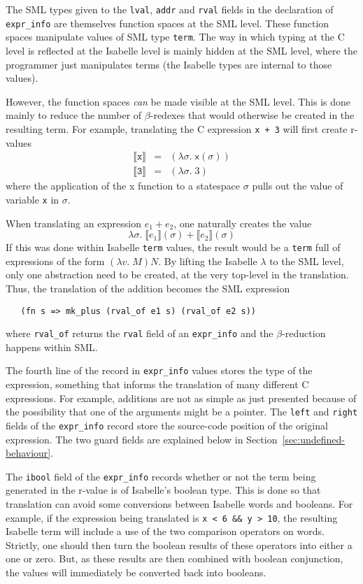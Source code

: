 \documentclass{article}
\newcommand{\Sem}[1]{\ensuremath{\llbracket#1\rrbracket}}
\begin{document}
The SML types given to the \texttt{lval}, \texttt{addr} and
\texttt{rval} fields in the declaration of \texttt{expr_info} are
themselves function spaces at the SML level.  These function spaces
manipulate values of SML type \texttt{term}.  The way in which typing
at the C level is reflected at the Isabelle level is mainly hidden at
the SML level, where the programmer just manipulates terms (the
Isabelle types are internal to those values).

However, the function spaces \emph{can} be made visible at the SML
level.  This is done mainly to reduce the number of $\beta$-redexes
that would otherwise be created in the resulting term.  For example,
translating the C expression \texttt{x~+~3} will first create r-values
\begin{eqnarray*}
\Sem{\texttt{x}} &=& (\lambda\sigma.\;\textsf{x}(\sigma))\\
\Sem{\texttt{3}} &=& (\lambda\sigma. \;3)
\end{eqnarray*}
where the application of the \textsf{x} function to a statespace
$\sigma$ pulls out the value of variable \texttt{x} in $\sigma$.

When translating an expression $e_1 + e_2$, one naturally creates the
value
\[
\lambda\sigma.\;\Sem{e_1}(\sigma) + \Sem{e_2}(\sigma)
\]
If this was done within Isabelle \texttt{term} values, the result
would be a \texttt{term} full of expressions of the form $(\lambda
v.\;M)N$.  By lifting the Isabelle $\lambda$ to the SML level, only
one abstraction need to be created, at the very top-level in the
translation.  Thus, the translation of the addition becomes the SML
expression
\begin{verbatim}
   (fn s => mk_plus (rval_of e1 s) (rval_of e2 s))
\end{verbatim}
where \texttt{rval_of} returns the \texttt{rval} field of an
\texttt{expr_info} and the $\beta$-reduction happens within SML.

The fourth line of the record in \texttt{expr_info} values stores the
type of the expression, something that informs the translation of many
different C expressions.  For example, additions are not as simple as
just presented because of the possibility that one of the arguments
might be a pointer.  The \texttt{left} and \texttt{right} fields of
the \texttt{expr_info} record store the source-code position of the
original expression.  The two guard fields are explained below in
Section~\ref{sec:undefined-behaviour}.

The \texttt{ibool} field of the \texttt{expr_info} records whether or
not the term being generated in the r-value is of Isabelle's boolean
type.  This is done so that translation can avoid some conversions
between Isabelle words and booleans.  For example, if the expression
being translated is \verb|x < 6 && y > 10|, the resulting Isabelle
term will include a use of the two comparison operators on words.
Strictly, one should then turn the boolean results of these operators
into either a one or zero.  But, as these results are then combined
with boolean conjunction, the values will immediately be converted
back into booleans.
\end{document}
